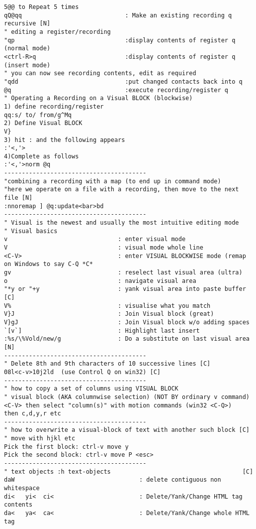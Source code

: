 \documentclass[10pt,landscape]{article}
\begin{document}
\begin{multicols}{2}
\begin{verbatim}
5@@ to Repeat 5 times
qQ@qq                             : Make an existing recording q recursive [N]
" editing a register/recording
"qp                               :display contents of register q (normal mode)
<ctrl-R>q                         :display contents of register q (insert mode)
" you can now see recording contents, edit as required
"qdd                              :put changed contacts back into q
@q                                :execute recording/register q
" Operating a Recording on a Visual BLOCK (blockwise)
1) define recording/register
qq:s/ to/ from/g^Mq
2) Define Visual BLOCK
V}
3) hit : and the following appears
:'<,'>
4)Complete as follows
:'<,'>norm @q
----------------------------------------
"combining a recording with a map (to end up in command mode)
"here we operate on a file with a recording, then move to the next file [N]
:nnoremap ] @q:update<bar>bd
----------------------------------------
" Visual is the newest and usually the most intuitive editing mode
" Visual basics
v                               : enter visual mode
V                               : visual mode whole line
<C-V>                           : enter VISUAL BLOCKWISE mode (remap on Windows to say C-Q *C*
gv                              : reselect last visual area (ultra)
o                               : navigate visual area
"*y or "+y                      : yank visual area into paste buffer  [C]
V%                              : visualise what you match
V}J                             : Join Visual block (great)
V}gJ                            : Join Visual block w/o adding spaces
`[v`]                           : Highlight last insert
:%s/\%Vold/new/g                : Do a substitute on last visual area [N]
----------------------------------------
" Delete 8th and 9th characters of 10 successive lines [C]
08l<c-v>10j2ld  (use Control Q on win32) [C]
----------------------------------------
" how to copy a set of columns using VISUAL BLOCK
" visual block (AKA columnwise selection) (NOT BY ordinary v command)
<C-V> then select "column(s)" with motion commands (win32 <C-Q>)
then c,d,y,r etc
----------------------------------------
" how to overwrite a visual-block of text with another such block [C]
" move with hjkl etc
Pick the first block: ctrl-v move y
Pick the second block: ctrl-v move P <esc>
----------------------------------------
" text objects :h text-objects                                     [C]
daW                                   : delete contiguous non whitespace
di<   yi<  ci<                        : Delete/Yank/Change HTML tag contents
da<   ya<  ca<                        : Delete/Yank/Change whole HTML tag

\end{verbatim}
\end{multicols}
\end{document}

